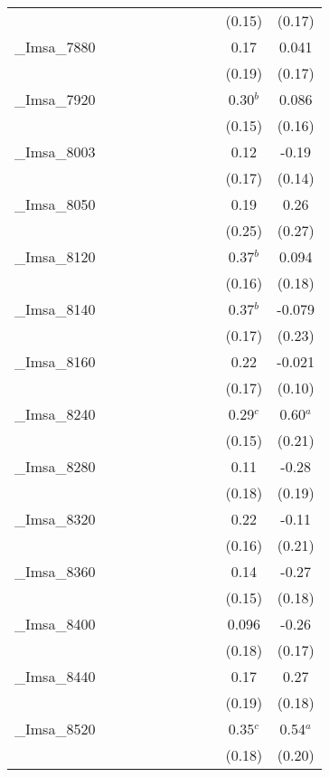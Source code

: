 \documentclass[]{article}
\begin{document}
\begin{tabular}{lcccccccccc}
 &  &  &  &  &  &  &  &  & (0.15) & (0.17) \\
\_Imsa\_7880 &  &  &  &  &  &  &  &  & 0.17 & 0.041 \\
 &  &  &  &  &  &  &  &  & (0.19) & (0.17) \\
\_Imsa\_7920 &  &  &  &  &  &  &  &  & 0.30$^b$ & 0.086 \\
 &  &  &  &  &  &  &  &  & (0.15) & (0.16) \\
\_Imsa\_8003 &  &  &  &  &  &  &  &  & 0.12 & -0.19 \\
 &  &  &  &  &  &  &  &  & (0.17) & (0.14) \\
\_Imsa\_8050 &  &  &  &  &  &  &  &  & 0.19 & 0.26 \\
 &  &  &  &  &  &  &  &  & (0.25) & (0.27) \\
\_Imsa\_8120 &  &  &  &  &  &  &  &  & 0.37$^b$ & 0.094 \\
 &  &  &  &  &  &  &  &  & (0.16) & (0.18) \\
\_Imsa\_8140 &  &  &  &  &  &  &  &  & 0.37$^b$ & -0.079 \\
 &  &  &  &  &  &  &  &  & (0.17) & (0.23) \\
\_Imsa\_8160 &  &  &  &  &  &  &  &  & 0.22 & -0.021 \\
 &  &  &  &  &  &  &  &  & (0.17) & (0.10) \\
\_Imsa\_8240 &  &  &  &  &  &  &  &  & 0.29$^c$ & 0.60$^a$ \\
 &  &  &  &  &  &  &  &  & (0.15) & (0.21) \\
\_Imsa\_8280 &  &  &  &  &  &  &  &  & 0.11 & -0.28 \\
 &  &  &  &  &  &  &  &  & (0.18) & (0.19) \\
\_Imsa\_8320 &  &  &  &  &  &  &  &  & 0.22 & -0.11 \\
 &  &  &  &  &  &  &  &  & (0.16) & (0.21) \\
\_Imsa\_8360 &  &  &  &  &  &  &  &  & 0.14 & -0.27 \\
 &  &  &  &  &  &  &  &  & (0.15) & (0.18) \\
\_Imsa\_8400 &  &  &  &  &  &  &  &  & 0.096 & -0.26 \\
 &  &  &  &  &  &  &  &  & (0.18) & (0.17) \\
\_Imsa\_8440 &  &  &  &  &  &  &  &  & 0.17 & 0.27 \\
 &  &  &  &  &  &  &  &  & (0.19) & (0.18) \\
\_Imsa\_8520 &  &  &  &  &  &  &  &  & 0.35$^c$ & 0.54$^a$ \\
 &  &  &  &  &  &  &  &  & (0.18) & (0.20) \\

\end{tabular}
\end{document}
